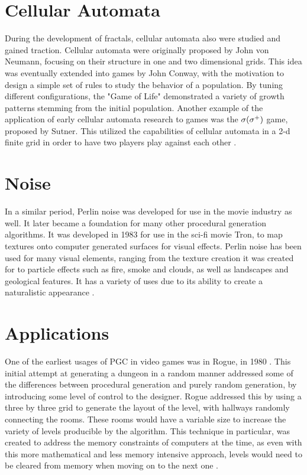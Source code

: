 \documentclass[10pt]{report}
\begin{document}
		\section{Cellular Automata}
		
		During the development of fractals, cellular automata also were studied and gained traction. Cellular automata were originally proposed by John von Neumann, focusing on their structure in one and two dimensional grids. This idea was eventually extended into games by John Conway, with the motivation to design a simple set of rules to study the behavior of a population. By tuning different configurations, the "Game of Life" demonstrated a variety of growth patterns stemming from the initial population. Another example of the application of early cellular automata research to games was the \(\sigma(\sigma\textsuperscript{+})\) game, proposed by Sutner. This utilized the capabilities of cellular automata in a 2-d finite grid in order to have two players play against each other \cite{10.1145/349194.349202}.
		
		\section{Noise}
		
		In a similar period, Perlin noise was developed for use in the movie industry as well. It later became a foundation for many other procedural generation algorithms. It was developed in 1983 for use in the sci-fi movie Tron, to map textures onto computer generated surfaces for visual effects. Perlin noise has been used for many visual elements, ranging from the texture creation it was created for to particle effects such as fire, smoke and clouds, as well as landscapes and geological features. It has a variety of uses due to its ability to create a naturalistic appearance \cite{10.1145/325165.325247}.
		
		\section{Applications}
		One of the earliest usages of PGC in video games was in Rogue, in 1980 \cite{rogue}. This initial attempt at generating a dungeon in a random manner addressed some of the differences between procedural generation and purely random generation, by introducing some level of control to the designer. Rogue addressed this by using a three by three grid to generate the layout of the level, with hallways randomly connecting the rooms. These rooms would have a variable size to increase the variety of levels producible by the algorithm. This technique in particular, was created to address the memory constraints of computers at the time, as even with this more mathematical and less memory intensive approach, levels would need to be cleared from memory when moving on to the next one \cite{rogue}.
		
\end{document}
